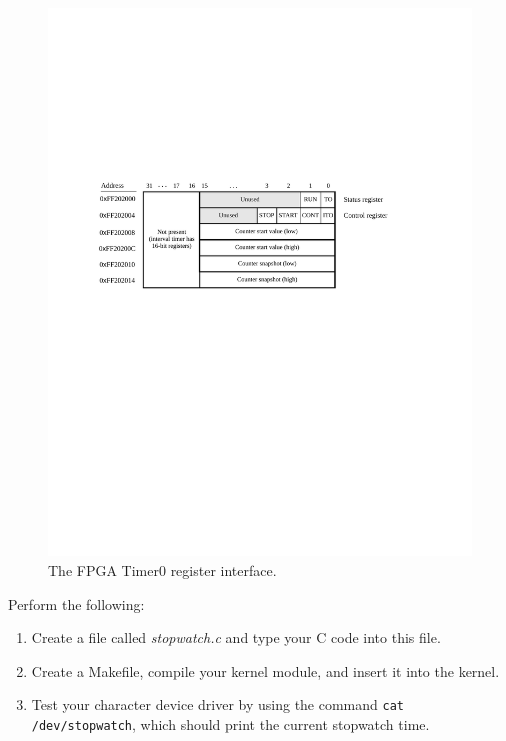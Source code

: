\documentclass[epsfig,10pt,fullpage]{article}
\begin{document}
~\\
\begin{figure}[htb]
	\begin{center}
	\includegraphics[scale=1]{figures/fig_interval_port.pdf}
	\end{center}
	\caption{The FPGA Timer0 register interface.}
\label{fig:timer}
\end{figure}

\noindent
Perform the following:

\begin{enumerate}
\item Create a file called {\it stopwatch.c} and type your C code into this file.

\item
Create a Makefile, compile your kernel module, and insert it into the kernel. 

\item
Test your character device driver by using the command \texttt{cat /dev/stopwatch}, which
should print the current stopwatch time.
\end{enumerate}
\end{document}
